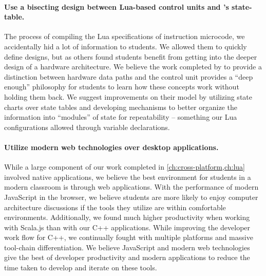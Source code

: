 \paragraph{Use a bisecting design between Lua-based control units and \cite{Black2013}'s state-table.} The process of compiling the Lua specifications of instruction microcode, we accidentally hid a lot of information to students. We allowed them to quickly define designs, but as others found \cite{Ackovska2014,Djordjevic2005,McLoughlin2010,Nakamura2013,Black2013} students benefit from getting into the deeper design of a hardware architecture. We believe the work completed by \cite{Black2013} to provide a distinction between hardware data paths and the control unit provides a ``deep enough'' philosophy for students to learn how these concepts work without holding them back. We suggest improvements on their model by utilizing state charts over state tables and developing mechanisms to better organize the information into ``modules'' of state for repeatability -- something our Lua configurations allowed through variable declarations. 

\paragraph{Utilize modern web technologies over desktop applications.} While a large component of our work completed in \cref{ch:cross-platform,ch:lua} involved native applications, we believe the best environment for students in a modern classroom is through web applications. With the performance of modern JavaScript in the browser, we believe students are more likely to enjoy computer architecture discussions if the tools they utilize are within comfortable environments. Additionally, we found much higher productivity when working with Scala.js than with our C++ applications. While improving the developer work flow for C++, we continually fought with multiple platforms and massive tool-chain differentiation. We believe JavaScript and modern web technologies give the best of developer productivity and modern applications to reduce the time taken to develop and iterate on these tools. 
